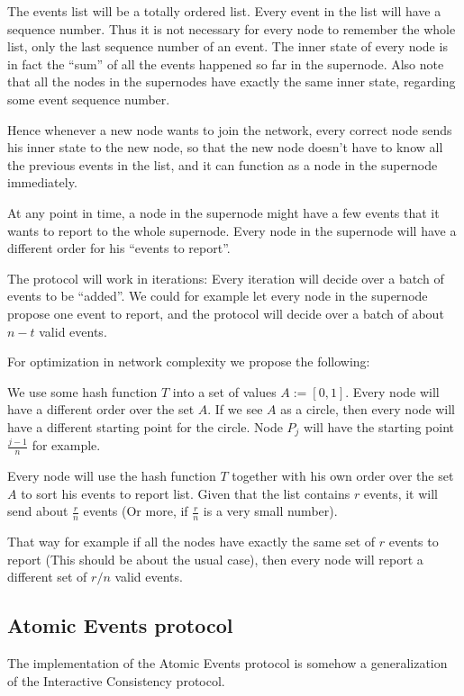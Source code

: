 The events list will be a totally ordered list. Every event in the list will
have a sequence number. Thus it is not necessary for every node to remember the
whole list, only the last sequence number of an event. The inner state of every
node is in fact the ``sum'' of all the events happened so far in the supernode.
Also note that all the nodes in the supernodes have exactly the same inner
state, regarding some event sequence number.

Hence whenever a new node wants to join the network, every correct node sends
his inner state to the new node, so that the new node doesn't have to know all
the previous events in the list, and it can function as a node in the supernode
immediately.

At any point in time, a node in the supernode might have a few events that it
wants to report to the whole supernode. Every node in the supernode will have a
different order for his ``events to report''.

The protocol will work in iterations: Every iteration will decide over a batch
of events to be ``added''. We could for example let every node in the supernode
propose one event to report, and the protocol will decide over a batch of about
$n-t$ valid events. 

For optimization in network complexity we propose the following: 

We use some hash function $T$ into a set of values $A := [0,1]$. Every node will
have a different order over the set $A$. If we see $A$ as a circle, then every
node will have a different starting point for the circle. Node $P_j$ will have
the starting point $\frac{j-1}{n}$ for example.

Every node will use the hash function $T$ together with his own order over the
set $A$ to sort his events to report list. Given that the list contains $r$
events, it will send about $\frac{r}{n}$ events (Or more, if $\frac{r}{n}$ is
a very small number). 

That way for example if all the nodes have exactly the same set of $r$ events to
report (This should be about the usual case), then every node will report a
different set of $r/n$ valid events.

\subsection{Atomic Events protocol}

The implementation of the Atomic Events protocol is somehow a generalization of
the Interactive Consistency protocol.

